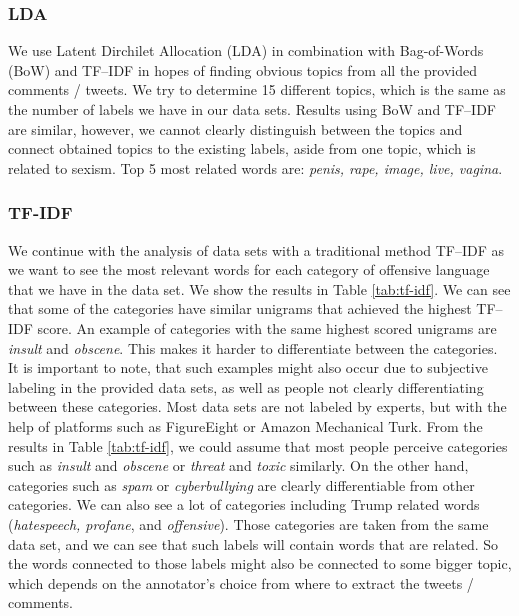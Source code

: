 \documentclass[fleqn,moreauthors,10pt]{ds_report}
\begin{document}
\subsubsection{LDA}
We use Latent Dirchilet Allocation (LDA) in combination with Bag-of-Words (BoW) and TF--IDF in hopes of finding obvious topics from all the provided comments / tweets. We try to determine 15 different topics, which is the same as the number of labels we have in our data sets. Results using BoW and TF--IDF are similar, however, we cannot clearly distinguish between the topics and connect obtained topics to the existing labels, aside from one topic, which is related to sexism. Top 5 most related words are: \textit{penis, rape, image, live, vagina}.

\subsubsection{TF-IDF}
We continue with the analysis of data sets with a traditional method TF--IDF as we want to see the most relevant words for each category of offensive language that we have in the data set. We show the results in Table \ref{tab:tf-idf}. We can see that some of the categories have similar unigrams that achieved the highest TF--IDF score. An example of categories with the same highest scored unigrams are \textit{insult} and \textit{obscene}. This makes it harder to differentiate between the categories. It is important to note, that such examples might also occur due to subjective labeling in the provided data sets, as well as people not clearly differentiating between these categories. Most data sets are not labeled by experts, but with the help of platforms such as FigureEight or Amazon Mechanical Turk. From the results in Table \ref{tab:tf-idf}, we could assume that most people perceive categories such as \textit{insult} and \textit{obscene} or \textit{threat} and \textit{toxic} similarly. On the other hand, categories such as \textit{spam} or \textit{cyberbullying} are clearly differentiable from other categories. We can also see a lot of categories including Trump related words (\textit{hatespeech, profane}, and \textit{offensive}). Those categories are taken from the same data set, and we can see that such labels will contain words that are related. So the words connected to those labels might also be connected to some bigger topic, which depends on the annotator's choice from where to extract the tweets / comments.
\end{document}
